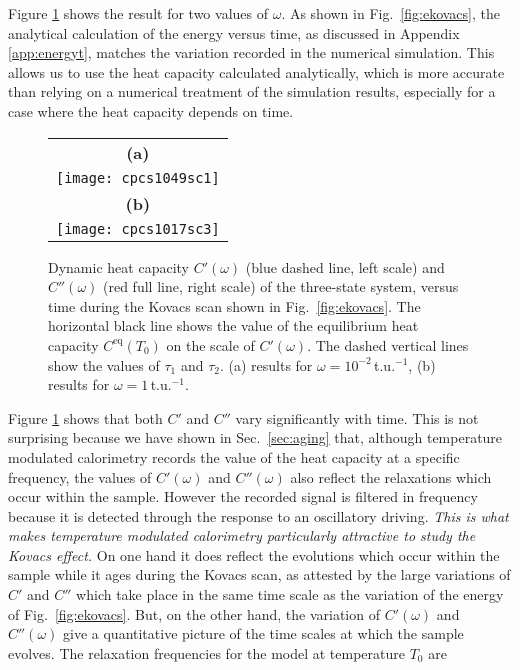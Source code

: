 \documentclass[pre,a4paper,twocolumn,superscriptaddress,%
floatfix]{revtex4}
\begin{document}
Figure \ref{fig:ckovacs} shows the result for two values of $\omega$.
As shown in Fig.~\ref{fig:ekovacs}, the analytical calculation of the energy
versus time, as discussed in Appendix \ref{app:energyt}, matches the variation
recorded in the numerical simulation. This allows us to use the heat
capacity calculated analytically, which is more accurate than relying on a
numerical treatment of the simulation results, especially for a case where the
heat capacity depends on time.  
\begin{figure}[h]
  \centering
  \begin{tabular}{c}
    \textbf{(a)} \\
    \texttt{[image: cpcs1049sc1]} \\
     \textbf{(b)} \\
    \texttt{[image: cpcs1017sc3]}
  \end{tabular}
  \caption{Dynamic heat capacity $C'(\omega)$ (blue dashed line,
    left scale) and
    $C''(\omega)$ (red full line, right scale) of the three-state
    system, versus time during the Kovacs scan shown in
    Fig.~\ref{fig:ekovacs}. 
    The horizontal black line shows the value of the equilibrium
  heat capacity $C^{\mathrm{eq}}(T_0)$ on the scale of $C'(\omega)$. The dashed
  vertical lines show the values of $\tau_1$ and $\tau_2$. 
  (a) results for $\omega = 10^{-2}\,$t.u.$^{-1}$,
  (b) results for $\omega = 1\,$t.u.$^{-1}$.}
  \label{fig:ckovacs}
\end{figure}
Figure \ref{fig:ckovacs} shows that both
$C'$ and $C''$ vary significantly with time. This is not surprising because we
have shown in Sec.~\ref{sec:aging} that, although temperature modulated
calorimetry records 
the value of the heat capacity at a specific frequency, the values of
$C'(\omega)$ and $C''(\omega)$ also reflect the relaxations which occur within
the sample. However the recorded signal is filtered in frequency because it is
detected through the response to an oscillatory driving. {\em This is what
makes temperature modulated calorimetry particularly attractive to study the
Kovacs 
effect.} On one hand it does reflect the evolutions which occur within the
sample while it ages during the Kovacs scan, as attested by the large
variations of $C'$ and $C''$ which take place in the same time scale as the
variation of the energy of Fig.~\ref{fig:ekovacs}. But, on the other hand, 
the variation of $C'(\omega)$ and $C''(\omega)$ give a quantitative
picture of the time scales at which the sample evolves.
The relaxation frequencies for the model at temperature $T_0$ are
\end{document}
